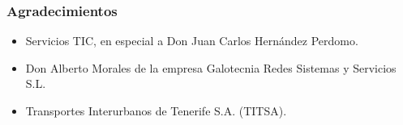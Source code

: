 \begin{frame}
  \frametitle{Agradecimientos}
    \begin{itemize}
    \item Servicios TIC, en especial a Don Juan Carlos Hernández Perdomo.
		\item Don Alberto Morales de la empresa Galotecnia Redes Sistemas y Servicios S.L.
		\item Transportes Interurbanos de Tenerife S.A. (TITSA).
    \end{itemize}
  \endblock{}
\end{frame}